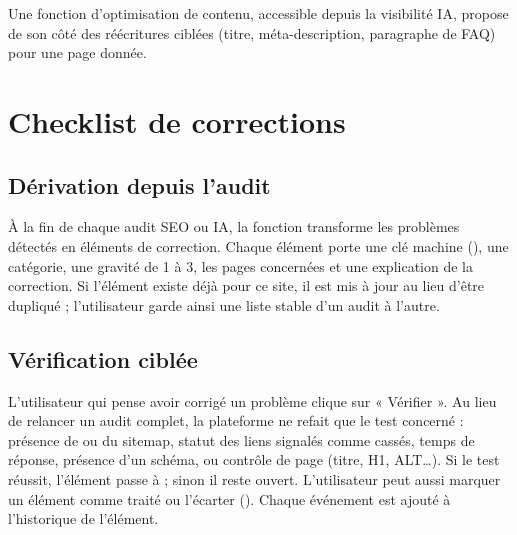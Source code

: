 


Une fonction d'optimisation de contenu, accessible depuis la visibilité IA, propose de son côté des réécritures ciblées (titre, méta-description, paragraphe de FAQ) pour une page donnée.

\section{Checklist de corrections}
\subsection{Dérivation depuis l'audit}
À la fin de chaque audit SEO ou IA, la fonction  transforme les problèmes détectés en éléments de correction. Chaque élément porte une clé machine (), une catégorie, une gravité de 1 à 3, les pages concernées et une explication de la correction. Si l'élément existe déjà pour ce site, il est mis à jour au lieu d'être dupliqué ; l'utilisateur garde ainsi une liste stable d'un audit à l'autre.

\subsection{Vérification ciblée}
L'utilisateur qui pense avoir corrigé un problème clique sur « Vérifier ». Au lieu de relancer un audit complet, la plateforme ne refait que le test concerné : présence de  ou du sitemap, statut des liens signalés comme cassés, temps de réponse, présence d'un schéma, ou contrôle de page (titre, H1, ALT\ldots). Si le test réussit, l'élément passe à  ; sinon il reste ouvert. L'utilisateur peut aussi marquer un élément comme traité ou l'écarter (). Chaque événement est ajouté à l'historique de l'élément.

